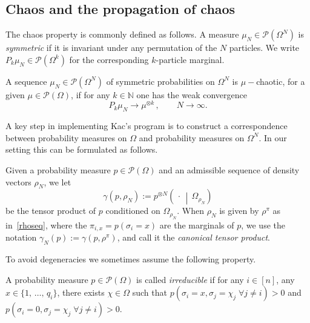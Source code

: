 \documentclass[AHL,Unicode,longabstracts,published]{cedram}
\newcommand{\Om}{\Omega}
\newcommand{\rhoN}{\rho^{\pi}}
\newcommand{\si}{\sigma}
\newcommand{\cP}{\mathcal{P}}
\newcommand{\bbN}{\mathbb{N}}
\let\g=\gamma
\let\r=\rho
\let\O=\Omega
\let\oldforall\forall
\renewcommand*{\forall}{\mathrel{\oldforall}}
\begin{document}
\subsection{Chaos and the propagation of chaos}

The chaos property is commonly defined as follows. A measure $\mu_N \in \cP(\O^{N})$ is \emph{symmetric} if it is invariant under any permutation of the $N$ particles. We write $ P_k\mu_N\in\cP(\O^k)$ for the corresponding $k$-particle marginal.


\begin{defi}\label{kacschaos}
A sequence $\mu_N \in \cP(\O^{N})$ of symmetric probabilities on $\Om^{N}$ is $\mu-$chaotic, for a given $\mu \in \cP(\O)$, if for any $k \in \bbN$ one has the weak convergence
\[
P_k\mu_N\longrightarrow \mu^{\otimes k}\,,\qquad N\to\infty.
\]
\end{defi}

A key step in implementing Kac's program is to construct a correspondence between probability measures on $\O$ and probability measures on $\O^N$. In our setting this can be formulated as follows.

\begin{defi}\label{def:canonical}
Given a probability measure $p \in \cP(\Om)$ and an admissible sequence of density vectors $\r_N$, we let
\[
\gamma(p,\r_N):=p^{\otimes N}\left(\,\cdot\,\middle|\,\Om_{\r_N}\right)
\]
be the tensor product of $p$ conditioned on $\Om_{\r_N}$. When $\r_N$ is given by $\rhoN$ as in~\eqref{rhoseq}, where the $\pi_{i,x}=p(\si_i=x)$ are the marginals of $p$, we use the notation $\g_N(p):= \gamma(p,\rhoN)$, and call it the \emph{canonical tensor product}.
\end{defi}

To avoid degeneracies we sometimes assume the following property.


\begin{defi}[Irreducibility]\label{def:irred}
A probability measure $p \in \cP(\Om)$ is called \emph{irreducible} if for any $i\in[n]$, any $x\in\{1,\,\dots,\,q_i\}$, there exists $\chi\in\O$ such that $p(\si_i=x,\si_{j}=\chi_{j}\;\forall j\neq i)>0$ and $p(\si_i=0,\si_{j}=\chi_{j}\;\forall j\neq i)>0$.
\end{defi}
\end{document}
